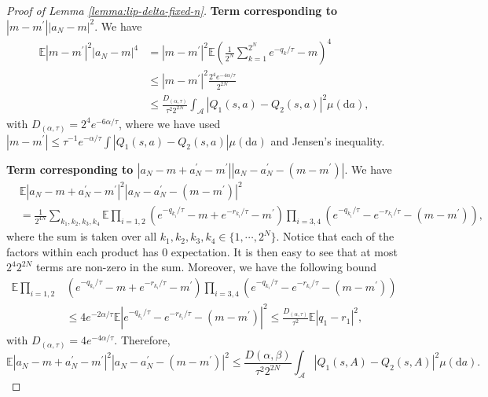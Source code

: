 \documentclass[11pt]{article}
\numberwithin{equation}{section}
\theoremstyle{definition}
\theoremstyle{remark}
\def\diff{{\mathrm{d}}}
\begin{document}
\begin{proof}[Proof of Lemma \ref{lemma:lip-delta-fixed-n}]
    \textbf{Term corresponding to $|m - m^\prime||a_N - m|^2$}.
    We have
    \begin{equation}
        \label{eq:lip-delta-fixed-n-second-bound}
        \begin{aligned}
            \mathbb E |m - m^\prime|^2|a_N - m|^4 & = |m - m^\prime|^2 \mathbb E \left( \frac{1}{2^N} \sum_{k = 1}^{2^N} e^{-q_k / \tau} - m \right)^4 \\
                                                  & \leq |m - m^\prime|^2 \frac{2^4 e^{-4\alpha / \tau}}{2^{2N}}                                        \\
                                                  & \leq \frac{D_{(\alpha,\tau)}}{\tau^2 2^{2N}} \int_{\mathcal A} |Q_1(s,a) - Q_2(s,a)|^2 \mu (\diff a),
        \end{aligned}
    \end{equation}
    with $D_{(\alpha,\tau)} = 2^4 e^{-6\alpha / \tau}$, where we have used $|m - m^\prime| \leq \tau^{-1}e^{-\alpha / \tau} \int |Q_1(s,a) - Q_2(s,a)| \mu (\diff a)$ and Jensen's inequality.

    \textbf{Term corresponding to $|a_N - m + a_N^\prime - m^\prime||a_N - a_N^\prime - (m - m^\prime)|$}.
    We have
    \[
        \begin{aligned}
             & \mathbb E |a_N - m + a_N^\prime - m^\prime|^2|a_N - a_N^\prime - (m - m^\prime)|^2                                                                                                                             \\
             & = \frac{1}{2^{4N}}\sum_{k_1,k_2,k_3,k_4} \mathbb E \prod_{i = 1,2}(e^{ -q_{k_i} / \tau} - m + e^{- r_{k_i} / \tau } - m^\prime) \prod_{i = 3,4} (e^{- q_{k_i} / \tau} - e^{- r_{k_i}/ \tau} - (m - m^\prime)),
        \end{aligned}
    \]
    where the sum is taken over all $k_1,k_2,k_3,k_4 \in \{ 1, \cdots, 2^N\}$. Notice that each of the factors within each product has $0$ expectation. It is then easy to see that at most $2^4 2^{2N}$ terms are non-zero in the sum. Moreover, we have the following bound
    \[
        \begin{aligned}
            \mathbb E \prod_{i = 1,2} & (e^{ -q_{k_i} / \tau} - m + e^{- r_{k_i} / \tau } - m^\prime) \prod_{i = 3,4} (e^{- q_{k_i} / \tau} - e^{- r_{k_i}/ \tau} - (m - m^\prime)) \\
                              & \leq 4 e^{-2\alpha / \tau} \mathbb E |e^{- q_{k_i} / \tau} - e^{- r_{k_i}/ \tau} - (m - m^\prime)|^2              \leq \frac{D_{(\alpha,\tau)}}{\tau^2} \mathbb E |q_1 - r_1|^2,
        \end{aligned}
    \]
    with $D_{(\alpha,\tau)} = 4 e^{-4\alpha / \tau}$.
    Therefore,
    \begin{equation}
        \label{eq:lip-delta-fixed-n-third-bound}
        \mathbb E |a_N - m + a_N^\prime - m^\prime|^2|a_N - a_N^\prime - (m - m^\prime)|^2  \leq \frac{D(\alpha, \beta)}{\tau^2 2^{2N}} \int_{\mathcal A}|Q_1(s,A) - Q_2(s,A)|^2 \mu (\diff a).
    \end{equation}


\end{proof}
\end{document}
